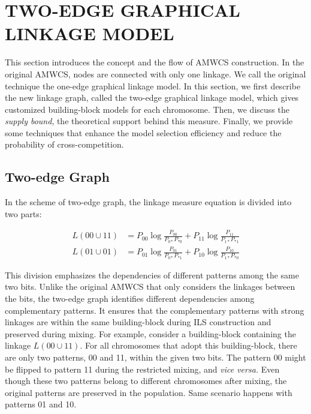 \section{TWO-EDGE GRAPHICAL LINKAGE MODEL}
This section introduces the concept and the flow of AMWCS construction. In the original AMWCS, nodes are connected with only one linkage. We call the original technique the one-edge graphical linkage model. In this section, we first describe the new linkage graph, called the two-edge graphical linkage model, which gives customized building-block models for each chromosome. Then, we discuss the \textit{supply bound}, the theoretical support behind this measure. Finally, we provide some techniques that enhance the model selection efficiency and reduce the probability of cross-competition. 

\subsection{Two-edge Graph}
In the scheme of two-edge graph, the linkage measure equation is divided into two parts:

\begin{equation} 
\begin{split}
L( 00 \cup 11 ) &= P_{00 }\log{\frac{P_{00}}{P_{0*} P_{*0}}} + P_{11 }\log{\frac{P_{11}}{P_{1*} P_{*1}}}  \\
L( 01 \cup 01 ) &= P_{01 }\log{\frac{P_{01}}{P_{0*} P_{*1}}} + P_{10 }\log{\frac{P_{10}}{P_{1*} P_{*0}}}  
\end{split}
\end{equation}

This division emphasizes the dependencies of different patterns among the same two bits. Unlike the original AMWCS that only considers the linkages between the bits, the two-edge graph identifies different dependencies among complementary patterns. It ensures that the complementary patterns with strong linkages are within the same building-block during ILS construction and preserved during mixing. For example, consider a building-block containing the linkage $L(00\cup11)$. For all chromosomes that adopt this building-block, there are only two patterns, 00 and 11, within the given two bits. The pattern 00 might be flipped to pattern 11 during the restricted mixing, and \textit{vice versa.} Even though these two patterns belong to different chromosomes after mixing, the original patterns are preserved in the population. Same scenario happens with patterns 01 and 10.


